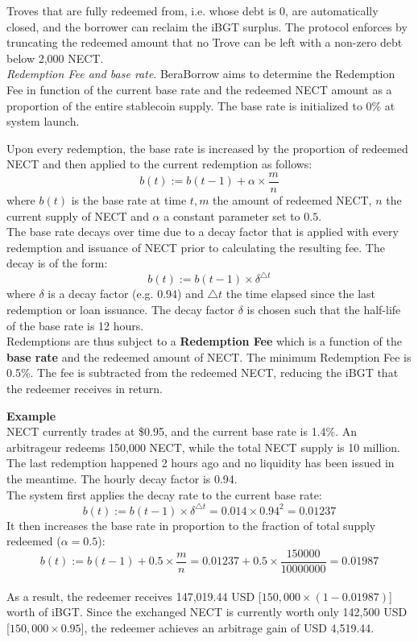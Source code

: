 \documentclass{article}
\begin{document}
Troves that are fully redeemed from, i.e. whose debt is 0, are automatically closed, and the borrower can reclaim the iBGT surplus. The protocol enforces by truncating the redeemed amount that no Trove can be left with a non-zero debt below 2,000 NECT. \\

\textit{Redemption Fee and base rate}. BeraBorrow aims to determine the Redemption Fee in function of the current base rate and the redeemed NECT amount as a proportion of the entire stablecoin supply. The base rate is initialized to 0\% at system launch.

Upon every redemption, the base rate is increased by the proportion of redeemed NECT and then applied to the current redemption as follows:
$$b(t):=b(t-1)+\alpha\times\frac{m}{n}$$
where $b(t)$ is the base rate at time $t,m$ the amount of redeemed NECT, $n$ the current supply of NECT and $\alpha$ a constant parameter set to $0.5$.\\

The base rate decays over time due to a decay factor that is applied with every redemption and issuance of NECT prior to calculating the resulting fee. The decay is of the form:
$$b(t):=b(t-1)\times\delta^{\triangle t}$$
where $\delta$ is a decay factor (e.g. 0.94) and $\triangle t$ the time elapsed since the last redemption or loan issuance. The decay factor $\delta$ is chosen such that the half-life of the base rate is 12 hours. \\

Redemptions are thus subject to a \textbf{Redemption Fee} which is a function of the \textbf{base rate} and the redeemed amount of NECT. The minimum Redemption Fee is 0.5\%. The fee is subtracted from the redeemed NECT, reducing the iBGT that the redeemer receives in return.\\
\begin{tcolorbox}
\textbf{Example}\\
NECT currently trades at \$0.95, and the current base rate is 1.4\%. An arbitrageur redeems 150,000 NECT, while the total NECT supply is 10 million. The last redemption happened 2 hours ago and no liquidity has been issued in the meantime. The hourly decay factor is 0.94.\\

The system first applies the decay rate to the current base rate:
$$b(t):=b(t-1)\times\delta^{\triangle t}=0.014\times0.94^2=0.01237$$
It then increases the base rate in proportion to the fraction of total supply redeemed ($\alpha= 0.5$):
$$b(t):=b(t-1)+0.5\times\frac{m}{n}=0.01237+0.5\times\frac{150000}{10000000}=0.01987$$
\\

As a result, the redeemer receives 147,019.44 USD [$150,000 \times (1 - 0.01987)$] worth of iBGT. Since the exchanged NECT is currently worth only 142,500 USD [$150,000 \times 0.95$], the redeemer achieves an arbitrage gain of USD 4,519.44.
\end{tcolorbox}
\end{document}
